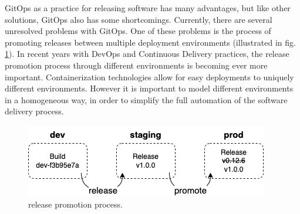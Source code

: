 %


\noindent
GitOps as a practice for releasing software has many advantages,
but like other solutions, GitOps also has some shortcomings.
Currently, there are several unresolved problems with GitOps.
One of these problems is
the process of promoting releases between multiple deployment environments (illustrated in fig. \ref{fig:releasePromotionProcess}).
In recent years with DevOps and Continuous Delivery practices,
the release promotion process through different environments is becoming ever more important.
Containerization technologies allow for easy deployments to
uniquely different environments.
However it is important to model different environments in
a homogeneous way,
in order to simplify the full automation of the software delivery process.

\begin{figure}[h]
	\centering
	\includegraphics[width=.55\linewidth]{figures/release-promotion.drawio.png}
	\caption{release promotion process.
	}
	\label{fig:releasePromotionProcess}	
\end{figure}

